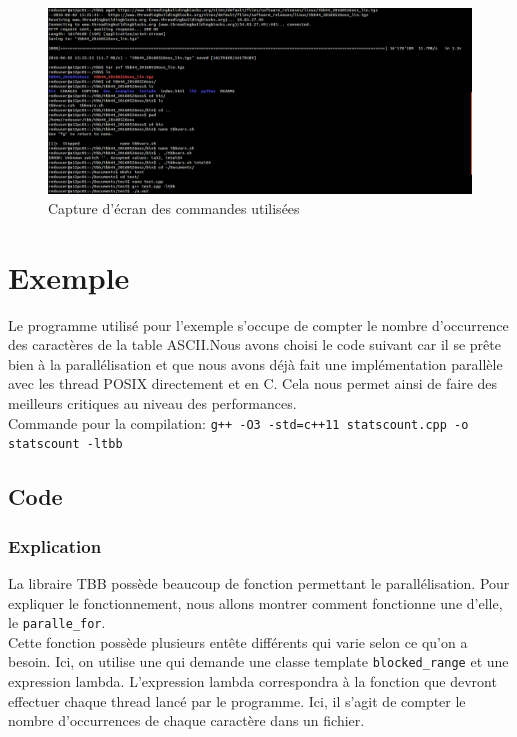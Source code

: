 \documentclass[10pt,a4paper]{article}
\begin{document}
\begin{figure}[hpl]
	\includegraphics[width=\textwidth]{images/installcommands.png}
	\caption{Capture d'écran des commandes utilisées}
\end{figure}

\newpage

\section{Exemple}
Le programme utilisé pour l'exemple s'occupe de compter le nombre d’occurrence des caractères de la table ASCII.Nous avons choisi le code suivant car il se prête bien à la parallélisation et que nous avons déjà fait une implémentation parallèle avec les thread POSIX directement et en C. Cela nous permet ainsi de faire des meilleurs critiques au niveau des performances.\\

Commande pour la compilation: \texttt{g++ -O3 -std=c++11 statscount.cpp -o statscount -ltbb}

\subsection{Code}


\subsubsection{Explication}
La libraire TBB possède beaucoup de fonction permettant le parallélisation. Pour expliquer le fonctionnement, nous allons montrer comment fonctionne une d'elle, le \texttt{paralle\_for}. \\

Cette fonction possède plusieurs entête différents qui varie selon ce qu'on a besoin. Ici, on utilise une qui demande une classe template \texttt{blocked\_range} et une expression lambda. L'expression lambda correspondra à la fonction que devront effectuer chaque thread lancé par le programme. Ici, il s'agit de compter le nombre d’occurrences de chaque caractère dans un fichier. 
\end{document}
